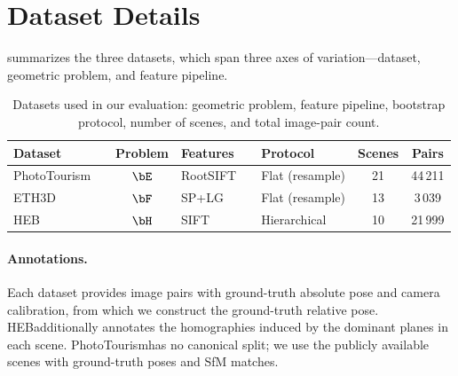 \documentclass{article}
\newcommand{\mname}[1]{\texorpdfstring{#1\xspace}{#1}}
\newcommand{\phototourism}{\mname{PhotoTourism}}
\newcommand{\ethd}{\mname{ETH3D}}
\newcommand{\heb}{\mname{HEB}}
\newcommand{\rootsift}{\mname{RootSIFT}}
\begin{document}


\section{Dataset Details}
\label{sec:supp-datasets}

 summarizes the three datasets, which span
three axes of variation---dataset, geometric problem, and
feature pipeline.

\begin{table}[ht]
	\centering
	\small
	\caption{Datasets used in our evaluation: geometric problem,
		feature pipeline, bootstrap protocol, number of scenes, and
		total image-pair count.}
	\label{tab:datasets}
	\begin{tabular}{l@{~}r c l@{~}r l c c}
		\toprule
		\multicolumn{2}{l}{Dataset} & Problem            & \multicolumn{2}{l}{Features} & Protocol  & Scenes                             & Pairs                          \\
		\midrule
		\phototourism               & \cite{Jin2021}     & $\bE$                        & \rootsift & \cite{Arandjelovic2012}            & Flat (resample) & 21 & 44\,211 \\
		\ethd                       & \cite{Schoeps2017} & $\bF$                        & SP+LG     & \cite{DeTone2018,Lindenberger2023} & Flat (resample) & 13 & 3\,039  \\
		\heb                        & \cite{Barath2023}  & $\bH$                        & SIFT      & \cite{Lowe2004}                    & Hierarchical    & 10 & 21\,999 \\
		\bottomrule
	\end{tabular}
\end{table}

\paragraph{Annotations.}
Each dataset provides image pairs with ground-truth absolute
pose and camera calibration, from which we construct the
ground-truth relative pose.  \heb additionally annotates the
homographies induced by the dominant planes in each scene.
\phototourism has no canonical split; we use the publicly available
scenes with ground-truth poses and SfM matches.
\end{document}
